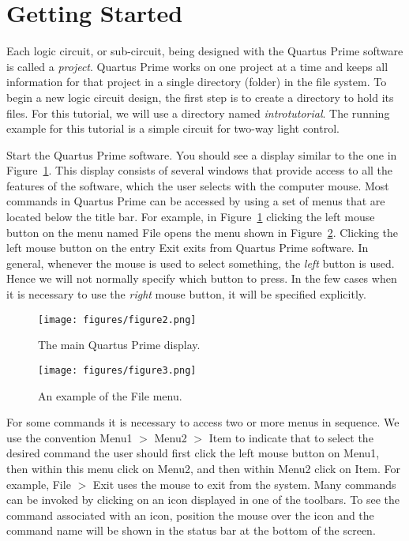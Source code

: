 \section{Getting Started}

\noindent 
Each logic circuit, or sub-circuit, being designed with the Quartus Prime software is
called a {\it project}. Quartus Prime works on one project at a time
and keeps all information for that project in a single directory (folder) in
the file system.  To begin a new logic circuit design, the first step is
to create a directory to hold its files.  For this tutorial, we will use a directory 
named {\it introtutorial}. The running example for this tutorial is a simple circuit for 
two-way light control.

Start the Quartus Prime software. You should see a display
similar to the one in Figure~\ref{fig:2}. This display consists of several windows that 
provide access to all the features of the software, which the user selects with the 
computer mouse. Most commands in Quartus Prime can be accessed by using 
a set of menus that are located below the title bar. For example, in Figure~\ref{fig:2} 
clicking the left mouse button on the menu named {\sf File} opens the menu shown in 
Figure~\ref{fig:3}. Clicking the left mouse button on the entry {\sf Exit} exits
from Quartus Prime software. In general, whenever the mouse is used to select
something, the {\it left} button is used. Hence we will not normally
specify which button to press. In the few cases when it is
necessary to use the {\it right} mouse button, it will be specified explicitly. 

\begin{figure}[H]
   \begin{center}
      \texttt{[image: figures/figure2.png]}
   \caption{The main Quartus Prime display.} 
	 \label{fig:2}
	 \end{center}
\end{figure}

\begin{figure}[H]
   \begin{center}
      \texttt{[image: figures/figure3.png]}
   \caption{An example of the File menu.} 
	 \label{fig:3}
	 \end{center}
\end{figure}

\newpage
For some commands it is necessary to access two or more menus in sequence.
We use the convention {\sf Menu1 $>$ Menu2 $>$ Item} to indicate that 
to select the desired command 
the user should first click the left mouse button on {\sf Menu1}, then 
within this menu click on {\sf Menu2}, and then
within {\sf Menu2} click on {\sf Item}. For example, 
{\sf File $>$ Exit} uses the mouse to exit from the system.
Many commands can be invoked by clicking on an icon displayed in 
one of the toolbars. To see the command associated with an icon, position the mouse
over the icon and the command name will be shown in the status bar at the bottom of the screen.
